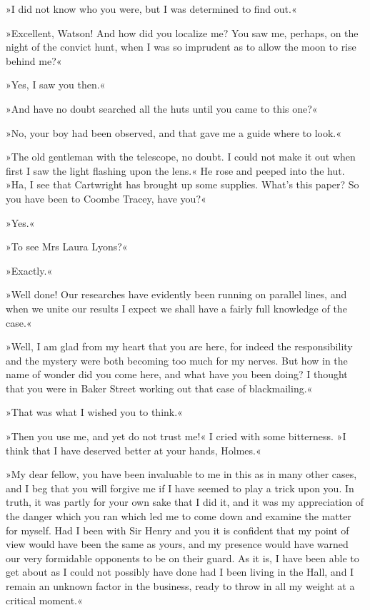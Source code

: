 »I did not know who you were, but I was determined to find out.«

»Excellent, Watson! And how did you localize me? You saw me, perhaps, on the night of the convict hunt, when I was so imprudent as to allow the moon to rise behind me?«

»Yes, I saw you then.«

»And have no doubt searched all the huts until you came to this one?«

»No, your boy had been observed, and that gave me a guide where to look.«

»The old gentleman with the telescope, no doubt. I could not make it out when first I saw the light flashing upon the lens.« He rose and peeped into the hut. »Ha, I see that Cartwright has brought up some supplies. What's this paper? So you have been to Coombe Tracey, have you?«

»Yes.«

»To see Mrs Laura Lyons?«

»Exactly.«

»Well done! Our researches have evidently been running on parallel lines, and when we unite our results I expect we shall have a fairly full knowledge of the case.«

»Well, I am glad from my heart that you are here, for indeed the responsibility and the mystery were both becoming too much for my nerves. But how in the name of wonder did you come here, and what have you been doing? I thought that you were in Baker Street working out that case of blackmailing.«

»That was what I wished you to think.«

»Then you use me, and yet do not trust me!« I cried with some bitterness. »I think that I have deserved better at your hands, \newline Holmes.«

»My dear fellow, you have been invaluable to me in this as in many other cases, and I beg that you will forgive me if I have seemed to play a trick upon you. In truth, it was partly for your own sake that I did it, and it was my appreciation of the danger which you ran which led me to come down and examine the matter for myself. Had I been with Sir Henry and you it is confident that my point of view would have been the same as yours, and my presence would have warned our very formidable opponents to be on their guard. As it is, I have been able to get about as I could not possibly have done had I been living in the Hall, and I remain an unknown factor in the business, ready to throw in all my weight at a critical moment.«

